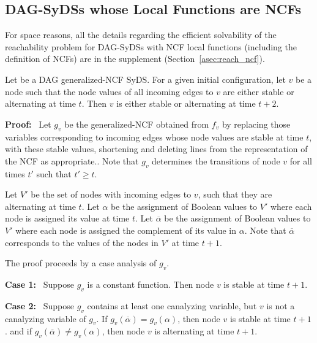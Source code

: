 \subsection{DAG-SyDSs whose Local Functions are NCFs}
\label{ssec:ncfs}

For space reasons, all the details regarding the efficient
solvability of the reachability problem 
for DAG-SyDSs with NCF local functions 
(including the definition of NCFs) 
are in the supplement (Section~\ref{asec:reach_ncf}).

\iffalse
\begin{lemma}\label{lem:ncf_plus_two}
Let \cals{} be a DAG generalized-NCF SyDS.
For a given initial configuration,
let $v$ be a node such that the node values of all incoming edges to $v$
are  either stable or alternating at time $t$.
Then  $v$ is either stable or alternating at time $t+2$.
\end{lemma}

\noindent
\textbf{Proof:}~ Let $g_v$ be the generalized-NCF obtained from $f_v$  
by replacing those variables corresponding to incoming edges 
whose node values are stable at time $t$,
with these stable values,
shortening and deleting lines from the representation of the NCF as appropriate.. 
Note that $g_v$ determines the transitions of node $v$ for all times $t'$ such that $t' \geq t$.

Let $V'$ be the set of nodes with incoming edges to $v$, such that they are alternating at time $t$.
Let $\alpha$  be the assignment of Boolean values to $V'$ 
where each node  is assigned its value at time $t$.
Let $\overline{\alpha}$  be the assignment of Boolean values to $V'$ 
where each node  is assigned the complement of its value in $\alpha$.
Note that $\overline{\alpha}$ corresponds to the values of the nodes in $V'$ at time $t+1$.


The proof proceeds by a case analysis of $g_v$.

\noindent
\textbf{Case 1:}~ Suppose $g_v$ is a constant function.
Then node $v$ is stable at time $t+1$.

\noindent
\textbf{Case 2:}~ Suppose $g_v$ contains at least one canalyzing variable, 
but $v$ is not a canalyzing variable of $g_v$.
If $g_v(\overline{\alpha}) = g_v(\alpha)$, then node $v$ is stable at time $t+1$.
and if $g_v(\overline{\alpha}) \neq g_v(\alpha)$, 
then node $v$ is alternating at time $t+1$.

